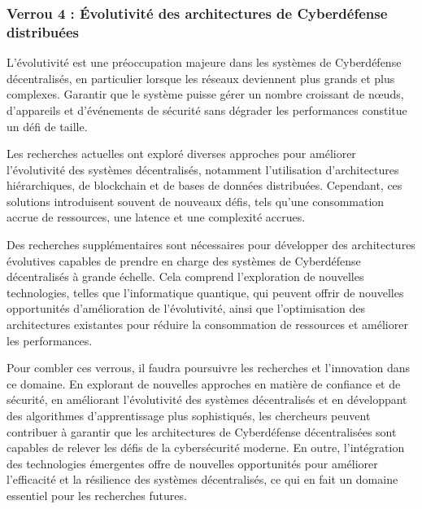 \subsubsection{Verrou 4 : Évolutivité des architectures de Cyberdéfense distribuées}

L'évolutivité est une préoccupation majeure dans les systèmes de Cyberdéfense décentralisés, en particulier lorsque les réseaux deviennent plus grands et plus complexes. Garantir que le système puisse gérer un nombre croissant de nœuds, d'appareils et d'événements de sécurité sans dégrader les performances constitue un défi de taille.

Les recherches actuelles ont exploré diverses approches pour améliorer l'évolutivité des systèmes décentralisés, notamment l'utilisation d'architectures hiérarchiques, de blockchain et de bases de données distribuées. Cependant, ces solutions introduisent souvent de nouveaux défis, tels qu'une consommation accrue de ressources, une latence et une complexité accrues.

Des recherches supplémentaires sont nécessaires pour développer des architectures évolutives capables de prendre en charge des systèmes de Cyberdéfense décentralisés à grande échelle. Cela comprend l'exploration de nouvelles technologies, telles que l'informatique quantique, qui peuvent offrir de nouvelles opportunités d'amélioration de l'évolutivité, ainsi que l'optimisation des architectures existantes pour réduire la consommation de ressources et améliorer les performances.





Pour combler ces verrous, il faudra poursuivre les recherches et l’innovation dans ce domaine. En explorant de nouvelles approches en matière de confiance et de sécurité, en améliorant l’évolutivité des systèmes décentralisés et en développant des algorithmes d’apprentissage plus sophistiqués, les chercheurs peuvent contribuer à garantir que les architectures de Cyberdéfense décentralisées sont capables de relever les défis de la cybersécurité moderne. En outre, l’intégration des technologies émergentes offre de nouvelles opportunités pour améliorer l’efficacité et la résilience des systèmes décentralisés, ce qui en fait un domaine essentiel pour les recherches futures.



